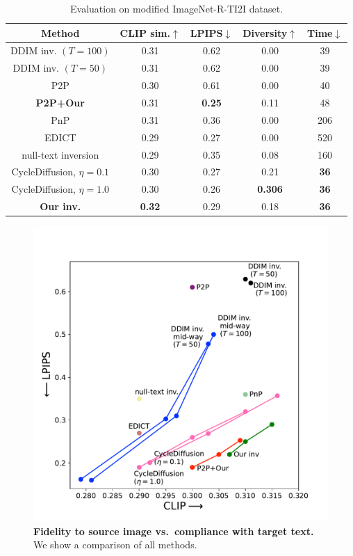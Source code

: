 \begin{table}[H]
\centering
\footnotesize
\begin{tabular}{| c | c c c c|} 
 \hline
 Method & CLIP sim.$\uparrow$ & LPIPS$\downarrow$ & Diversity$\uparrow$ & Time$\downarrow$ \\[0.5ex]
 \hline\hline
 DDIM inv. $(T=100)$  & 0.31 & 0.62 & 0.00 & 39\\
 DDIM inv. $(T=50)$  & 0.31 & 0.62 & 0.00 & 39\\
 P2P & 0.30 & 0.61 & 0.00 & 40\\
 \bf{P2P+Our}  & 0.31 & \bf{0.25} & 0.11 & 48\\  %
 PnP & 0.31 & 0.36 & 0.00 & 206\\ 
 EDICT & 0.29 & 0.27 & 0.00 & 520\\ 
 null-text inversion & 0.29 & 0.35 & 0.08 & 160\\ 
 CycleDiffusion, \!$\eta\!=\!0.1$ & 0.30 & 0.27 & 0.21 &  \bf{36}\\ 
 CycleDiffusion, \!$\eta\!=\!1.0$ & 0.30 & 0.26 & \bf{0.306} &  \bf{36}\\ 
\bf{Our inv.}  & \bf{0.32} &0.29 & 0.18 & \bf{36}\\
\hline
\end{tabular}
\caption{Evaluation on modified ImageNet-R-TI2I dataset.}
\label{tab:comparison_table}
\end{table}



\begin{figure}[h]
\centering
\includegraphics[width=0.7\columnwidth]{ICCV23_submission/figures/clip_lpips_all.pdf}
\caption{\textbf{Fidelity to source image vs.~compliance with target text.} We show a comparison of all methods.}%
\label{fig:clip_lpips_all}
\end{figure}

